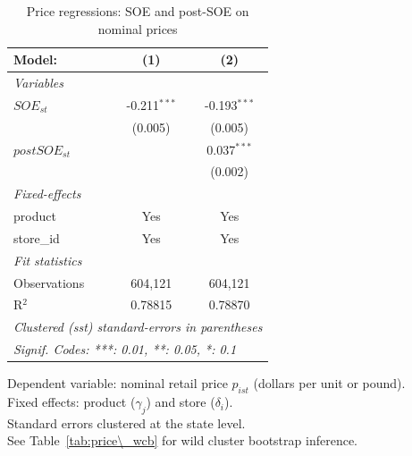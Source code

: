 
\begin{table}[htbp]
   \caption{\label{tab:price_reg} Price regressions: SOE and post-SOE on nominal prices}
   \centering
   \begin{tabular}{lcc}
      \tabularnewline \midrule \midrule
      Model:         & (1)            & (2)\\  
      \midrule
      \emph{Variables}\\
      $SOE_{st}$     & -0.211$^{***}$ & -0.193$^{***}$\\   
                     & (0.005)        & (0.005)\\   
      $postSOE_{st}$ &                & 0.037$^{***}$\\   
                     &                & (0.002)\\   
      \midrule
      \emph{Fixed-effects}\\
      product        & Yes            & Yes\\  
      store\_id      & Yes            & Yes\\  
      \midrule
      \emph{Fit statistics}\\
      Observations   & 604,121        & 604,121\\  
      R$^2$          & 0.78815        & 0.78870\\  
      \midrule \midrule
      \multicolumn{3}{l}{\emph{Clustered (sst) standard-errors in parentheses}}\\
      \multicolumn{3}{l}{\emph{Signif. Codes: ***: 0.01, **: 0.05, *: 0.1}}\\
   \end{tabular}
   
   \par \raggedright 
   Dependent variable: nominal retail price $p_{ist}$ (dollars per unit or pound).\\
   Fixed effects: product ($\gamma_j$) and store ($\delta_i$).\\
   Standard errors clustered at the state level.\\
   See Table~\ref{tab:price\_wcb} for wild cluster bootstrap inference.
\end{table}


